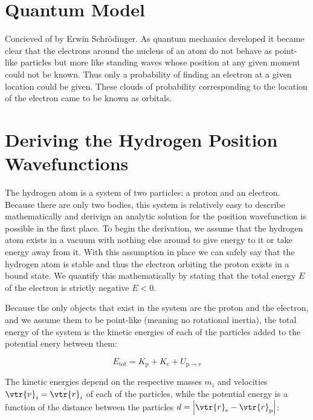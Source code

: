 \documentclass{article}
\begin{document}
    \section{Quantum Model}

    Concieved of by Erwin Schrödinger. As quantum mechanics developed it became clear that the electrons around the nucleus of an atom
    do not behave as point-like particles but more like standing waves whose position at any given moment could not be known. Thus only
    a probability of finding an electron at a given location could be given. These clouds of probability corresponding to the location of
    the electron came to be known as orbitals.

    \section{Deriving the Hydrogen Position Wavefunctions}

    The hydrogen atom is a system of two particles: a proton and an electron. Because there are only two bodies, this system is relatively
    easy to describe mathematically and derivign an analytic solution for the position wavefunction is possible in the first place.
    To begin the derivation, we assume that the hydrogen atom exists in a vacuum with nothing else around to give energy to it or take energy
    away from it. With this assumption in place we can safely say that the hydrogen atom is stable and thus the electron orbiting the proton
    exists in a bound state. We quantify this mathematically by stating that the total energy $E$ of the electron is strictly negative $E < 0$.

    Because the only objects that exist in the system are the proton and the electron, and we assume them to be point-like (meaning no rotational
    inertia), the total energy of the system is the kinetic energies of each of the particles added to the potential enery between them:

    \begin{equation}
        E_{\mathrm{tot}} = K_{\mathrm{p}} + K_{\mathrm{e}} + U_{\mathrm{p}\to\mathrm{e}}
    \end{equation}

    The kinetic energies depend on the respective masses $m_i$ and velocities $\vtr{v}_i = \dot{\vtr{r}}_i$ of each of the particles, while the potential energy is a function
    of the distance between the particles $d = \left| \vtr{r}_{\mathrm{e}} - \vtr{r}_{\mathrm{p}} \right|$:
\end{document}

